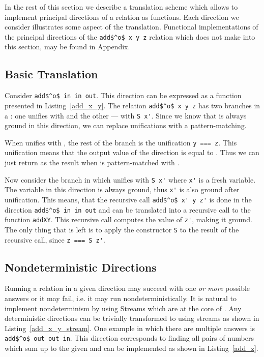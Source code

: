 In the rest of this section we describe a translation scheme which allows to implement principal directions of a relation as functions.
Each direction we consider illustrates some aspect of the translation.
Functional implementations of the principal directions of the \lstinline{add$^o$ x y z} relation which does not make into this section, may be found in Appendix.

\subsection{Basic Translation}

Consider \lstinline{add$^o$ in in out}.
This direction can be expressed as a function presented in Listing~\ref{add_x_y}.
The relation \lstinline{add$^o$ x y z} has two branches in a \conde: one unifies \x with \zero and the other --- with \lstinline{S x'}.
Since we know that \x is always ground in this direction, we can replace unifications with a pattern-matching.

When \x unifies with \zero, the rest of the \conde branch is the unification \lstinline{y === z}.
This unification means that the output value of the direction is equal to \y.
Thus we can just return \y as the result when \x is pattern-matched with \zero.

Now consider the \conde branch in which \x unifies with \lstinline{S x'} where \lstinline{x'} is a fresh variable.
The variable \x in this direction is always ground, thus \lstinline{x'} is also ground after unification.
This means, that the recursive call \lstinline{add$^o$ x' y z'} is done in the direction \lstinline{add$^o$ in in out} and can be translated into a recursive call to the function \lstinline{addXY}.
This recursive call computes the value of \lstinline{z'}, making it ground.
The only thing that is left is to apply the constructor \lstinline{S} to the result of the recursive call, since \lstinline{z === S z'}.




\subsection{Nondeterministic Directions}

Running a relation in a given direction may succeed with one \emph{or more} possible answers or it may fail, i.e. it may run nondeterministically.
It is natural to implement nondeterminism by using Streams which are at the core of \mk.
Any deterministic directions can be trivially transformed to using streams as shown in Listing~\ref{add_x_y_stream}.
One example in which there are multiple answers is \lstinline{add$^o$ out out in}.
This direction corresponds to finding all pairs of numbers which sum up to the given \z and can be implemented as shown in Listing~\ref{add_z}.

